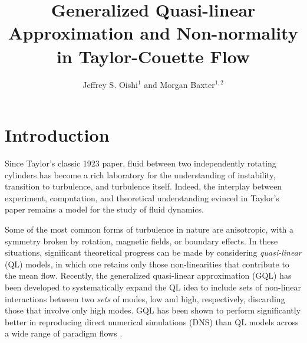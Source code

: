 \documentclass[openacc]{rstransa}%
\begin{document}
\title{Generalized Quasi-linear Approximation and Non-normality in Taylor-Couette Flow}

\author{%
Jeffrey S. Oishi$^{1}$ and Morgan Baxter$^{1,2}$}

\address{$^{1}$Department of Physics and Astronomy, Bates College, Lewiston, ME USA\\
$^{2}$Company Name, Whereever, USA}

\subject{xxxxx, xxxxx, xxxx}



\begin{abstract}

\end{abstract}


\begin{fmtext}
\end{fmtext}

\maketitle

\section{Introduction}
\label{sec:intro}
Since Taylor's classic 1923 paper\cite{1923RSPTA.223..289T}, fluid between two independently rotating cylinders has become a rich laboratory for the understanding of instability, transition to turbulence, and turbulence itself. Indeed, the interplay between experiment, computation, and theoretical understanding evinced in Taylor's paper remains a model for the study of fluid dynamics.

Some of the most common forms of turbulence in nature are anisotropic, with a symmetry broken by rotation, magnetic fields, or boundary effects. In these situations, significant theoretical progress can be made by considering \emph{quasi-linear} (QL) models, in which one retains only those non-linearities that contribute to the mean flow. Recently, the generalized quasi-linear approximation (GQL) has been developed to systematically expand the QL idea to include sets of non-linear interactions between two \emph{sets} of modes, low and high, respectively, discarding those that involve only high modes. GQL has been shown to perform significantly better in reproducing direct numerical simulations (DNS) than QL models across a wide range of paradigm flows \cite{2016PhRvL.116u4501M,2017JFM...810..412T, 2022arXiv220505513M}. 
\end{document}
